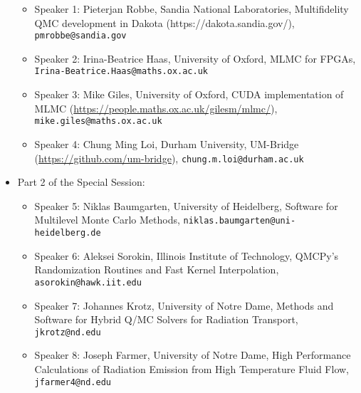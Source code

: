 \begin{session}
\begin{itemize}
 \begin{itemize}
 \item Speaker 1: Pieterjan Robbe, Sandia National Laboratories, Multifidelity QMC development in Dakota (https://dakota.sandia.gov/), \texttt{pmrobbe@sandia.gov}
 \item Speaker 2: Irina-Beatrice Haas, University of Oxford,  MLMC for FPGAs, \newline \texttt{Irina-Beatrice.Haas@maths.ox.ac.uk}
 \item Speaker 3: Mike Giles, University of Oxford, CUDA implementation of MLMC (\url{https://people.maths.ox.ac.uk/gilesm/mlmc/}), \texttt{mike.giles@maths.ox.ac.uk}
 \item Speaker 4: Chung Ming Loi,  Durham University, UM-Bridge (\url{https://github.com/um-bridge}), \texttt{chung.m.loi@durham.ac.uk} %
 \end{itemize}
 \item Part 2 of the Special Session:
 \begin{itemize}
 \item Speaker 5:  Niklas Baumgarten, University of Heidelberg, Software for Multilevel Monte Carlo Methods, \texttt{niklas.baumgarten@uni-heidelberg.de}
 \item Speaker 6: Aleksei Sorokin,  Illinois Institute of Technology, QMCPy's Randomization Routines and Fast Kernel Interpolation, \texttt{asorokin@hawk.iit.edu}
 \item Speaker 7:  Johannes Krotz, University of Notre Dame, Methods and Software for Hybrid Q/MC Solvers for Radiation Transport, \texttt{jkrotz@nd.edu} %
 \item Speaker 8: Joseph Farmer, University of Notre Dame, High Performance Calculations of Radiation Emission from High Temperature Fluid Flow, \texttt{jfarmer4@nd.edu} %
 \end{itemize}
 \end{itemize}
 \medskip
 \begin{comment}
 If you would like to include references, please do so by creating a simple list numbered by [1], [2], [3], \ldots. See example below.
 Please do not use the \texttt{bibliography} environment or \texttt{bibtex} files.
 \begin{enumerate}
 \item[{[1]}] Niederreiter, Harald (1992). {\it Random number generation and quasi-Monte Carlo methods}. Society for Industrial and Applied Mathematics (SIAM).
 \item[{[2]}] Roberts, Gareth O, \& Rosenthal, Jeffrey S. (2002).  Optimal scaling for various Metropolis-Hastings algorithms, \textbf{16}(4), 351--367.
 \end{enumerate}
 Equations may be used if they are referenced. Please note that the equation numbers may be different (but will be cross-referenced correctly) in the final program book.
 \end{comment}
\end{session}



